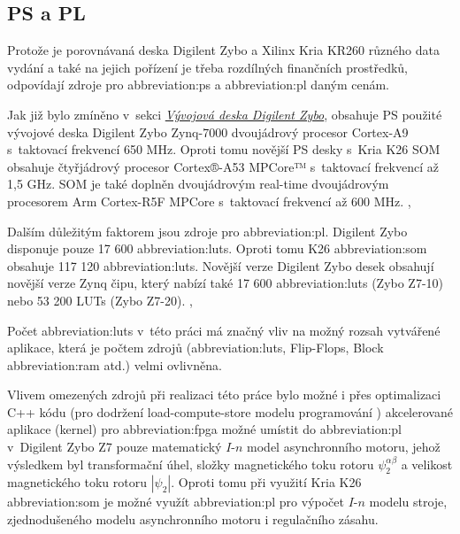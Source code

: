 \documentclass[a4paper, twoside, 11pt]{article}
\begin{document}
			\subsection{PS a PL}\label{subsec:ps-a-pl}
					Protože je porovnávaná deska Digilent Zybo a Xilinx Kria KR260 různého data vydání a také na jejich pořízení je třeba rozdílných finančních prostředků, odpovídají zdroje pro \gls{abbreviation:ps} a \gls{abbreviation:pl} daným cenám.\par
					Jak již bylo zmíněno v~sekci \hyperref[sec:vyvojova-deska-digilent-zybo]{\textit{Vývojová deska Digilent Zybo}}, obsahuje PS použité vývojové deska Digilent Zybo Zynq-7000 dvoujádrový procesor Cortex-A9 s~taktovací frekvencí 650 MHz. Oproti tomu novější PS desky s~Kria K26 SOM obsahuje čtyřjádrový procesor Cortex®-A53 MPCore™ s~taktovací frekvencí až 1,5 GHz. SOM je také doplněn dvoujádrovým real-time dvoujádrovým procesorem Arm Cortex-R5F MPCore s~taktovací frekvencí až 600 MHz. \cite{digilent-zybo-reference-manual}, \cite{kria-k26-som-ds}\par
					Dalším důležitým faktorem jsou zdroje pro \gls{abbreviation:pl}. Digilent Zybo disponuje pouze 17 600 \gls{abbreviation:luts}. Oproti tomu K26 \gls{abbreviation:som} obsahuje 117 120 \gls{abbreviation:luts}. Novější verze Digilent Zybo desek obsahují novější verze Zynq čipu, který nabízí také 17 600 \gls{abbreviation:luts} (Zybo Z7-10) nebo 53 200 LUTs (Zybo Z7-20). \cite{digilent-zybo-reference-manual}, \cite{kria-k26-som-ds}\par
					Počet \gls{abbreviation:luts} v~této práci má značný vliv na možný rozsah vytvářené aplikace, která je počtem zdrojů (\gls{abbreviation:luts}, Flip-Flops, Block \gls{abbreviation:ram} atd.) velmi ovlivněna.\par
					Vlivem omezených zdrojů při realizaci této práce bylo možné i přes optimalizaci C++ kódu (pro dodržení load-compute-store modelu programování \cite{vitis-unified-software-platform-documentation-2022}) akcelerované aplikace (kernel) pro \gls{abbreviation:fpga} možné umístit do \gls{abbreviation:pl} v~Digilent Zybo Z7 pouze matematický $I$-$n$ model asynchronního motoru, jehož výsledkem byl transformační úhel, složky magnetického toku rotoru $\psi_2^{\alpha \beta}$ a velikost magnetického toku rotoru $| \psi_2 |$. Oproti tomu při využití Kria K26 \gls{abbreviation:som} je možné využít \gls{abbreviation:pl} pro výpočet $I$-$n$ modelu stroje, zjednodušeného modelu asynchronního motoru i regulačního zásahu.
\end{document}
